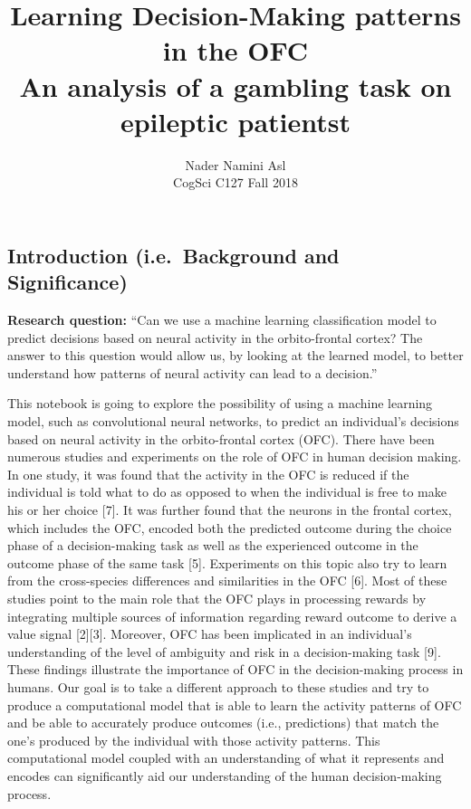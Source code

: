 \documentclass[11pt]{article}
\title{Learning Decision-Making patterns in the OFC\\[1em]
    \large An analysis of a gambling task on epileptic patientst}
\author{Nader Namini Asl\\[0.75em]\small CogSci C127 Fall 2018}
\begin{document}
    
    
    \maketitle
    
    
\section{}

    \hypertarget{introduction-i.e.background-and-significance}{%
\subsection{Introduction (i.e.~Background and
Significance)}\label{introduction-i.e.background-and-significance}}

    \textbf{Research question:} ``Can we use a machine learning
classification model to predict decisions based on neural activity in
the orbito-frontal cortex? The answer to this question would allow us,
by looking at the learned model, to better understand how patterns of
neural activity can lead to a decision.''

This notebook is going to explore the possibility of using a machine
learning model, such as convolutional neural networks, to predict an
individual's decisions based on neural activity in the orbito-frontal
cortex (OFC). There have been numerous studies and experiments on the
role of OFC in human decision making. In one study, it was found that
the activity in the OFC is reduced if the individual is told what to do
as opposed to when the individual is free to make his or her choice
{[}7{]}. It was further found that the neurons in the frontal cortex,
which includes the OFC, encoded both the predicted outcome during the
choice phase of a decision-making task as well as the experienced
outcome in the outcome phase of the same task {[}5{]}. Experiments on
this topic also try to learn from the cross-species differences and
similarities in the OFC {[}6{]}. Most of these studies point to the main
role that the OFC plays in processing rewards by integrating multiple
sources of information regarding reward outcome to derive a value signal
{[}2{]}{[}3{]}. Moreover, OFC has been implicated in an individual's
understanding of the level of ambiguity and risk in a decision-making
task {[}9{]}. These findings illustrate the importance of OFC in the
decision-making process in humans. Our goal is to take a different
approach to these studies and try to produce a computational model that
is able to learn the activity patterns of OFC and be able to accurately
produce outcomes (i.e., predictions) that match the one's produced by
the individual with those activity patterns. This computational model
coupled with an understanding of what it represents and encodes can
significantly aid our understanding of the human decision-making
process.
\end{document}
